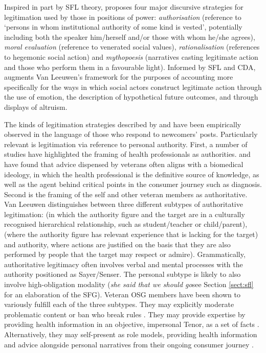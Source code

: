 Inspired in part by \gls{SFL} theory, \textcite[p.~92]{van_leeuwen_legitimation_2007} proposes four major discursive strategies for legitimation used by those in positions of power: \emph{authorisation} (reference to `persons in whom institutional authority of some kind is vested', potentially including both the speaker him\slash herself and\slash or those with whom he\slash she agrees), \emph{moral evaluation} (reference to venerated social values), \emph{rationalisation} (references to hegemonic social action) and \emph{mythopoesis} (narratives casting legitimate action and those who perform them in a favourable light). Informed by \gls{SFL} and \gls{CDA}, \textcite[p.~782]{reyes_strategies_2011} augments Van Leeuwen's framework for the purposes of accounting more specifically for the ways in which social actors construct legitimate action through the use of emotion, the description of hypothetical future outcomes, and through displays of altruism. %

The kinds of legitimation strategies described by \textcite{van_leeuwen_legitimation_2007} and \textcite{reyes_strategies_2011} have been empirically observed in the language of those who respond to newcomers' \glspl{post}. Particularly relevant is legitimation via reference to personal authority. First, a number of studies have highlighted the framing of health professionals as authorities. \textcite{smithson_problem_2011} and \textcite{vayreda_social_2009} have found that advice dispensed by veterans often aligns with a biomedical ideology, in which the health professional is the definitive source of knowledge, as well as the agent behind critical points in the consumer journey such as diagnosis. Second is the framing of the self and other veteran \glspl{member} as authoritative. Van Leeuwen distinguishes between three different subtypes of authoritative legitimation:  (in which the authority figure and the target are in a culturally recognised hierarchical relationship, such as student\slash teacher or child\slash parent),  (where the authority figure has relevant experience that is lacking for the target) and  authority, where actions are justified on the basis that they are also performed by people that the target may respect or admire). Grammatically, authoritative legitimacy often involves verbal and mental processes with the authority positioned as Sayer\slash Senser. The personal subtype is likely to also involve high\hyp{}obligation modality (\emph{she said that we should go}\textemdash{}see Section \ref{sect:sfl} for an elaboration of the \gls{SFG}). Veteran \gls{OSG} \glspl{member} have been shown to variously fulfill each of the three subtypes. They may explicitly moderate problematic content or ban  who break rules \cite{weber_missed_2011}. They may provide expertise by providing health information in an objective, impersonal Tenor, as a set of facts \cite{kaufman2016producing}. Alternatively, they may self\hyp{}present as role models, providing health information and advice alongside personal narratives from their ongoing consumer journey \cite{koteyko2015performing}.


